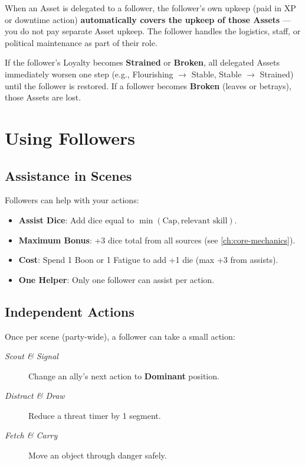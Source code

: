 When an Asset is delegated to a follower, the follower's own upkeep (paid in XP or downtime action) \textbf{automatically covers the upkeep of those Assets} --- you do not pay separate Asset upkeep. The follower handles the logistics, staff, or political maintenance as part of their role.

If the follower's Loyalty becomes \textbf{Strained} or \textbf{Broken}, all delegated Assets immediately worsen one step (e.g., Flourishing $\rightarrow$ Stable, Stable $\rightarrow$ Strained) until the follower is restored. If a follower becomes \textbf{Broken} (leaves or betrays), those Assets are lost.

\section{Using Followers}
\label{sec:using-followers}

\subsection*{Assistance in Scenes}
\label{sec:follower-assistance}
Followers can help with your actions:
\begin{itemize}
\item \textbf{Assist Dice}: Add dice equal to $\min(\text{Cap}, \text{relevant skill})$.
\item \textbf{Maximum Bonus}: +3 dice total from all sources (see \ref{ch:core-mechanics}).
\item \textbf{Cost}: Spend 1 Boon or 1 Fatigue to add +1 die (max +3 from assists).
\item \textbf{One Helper}: Only one follower can assist per action.
\end{itemize}

\subsection*{Independent Actions}
\label{sec:follower-independent}
Once per scene (party-wide), a follower can take a small action:
\begin{description}
\item[\emph{Scout \& Signal}] Change an ally's next action to \textbf{Dominant} position.
\item[\emph{Distract \& Draw}] Reduce a threat timer by 1 segment.
\item[\emph{Fetch \& Carry}] Move an object through danger safely.
\end{description}

